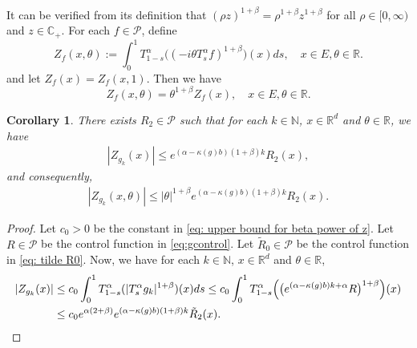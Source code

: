\documentclass[12pt, a4paper]{amsart}
\newtheorem{cor}[thm]{Corollary}
\theoremstyle{definition}
\numberwithin{equation}{section}
\begin{document}
    It can be verified from its definition that $(\rho z)^{1+\beta} = \rho^{1+\beta}z^{1+\beta}$ for all $\rho \in [0,\infty)$ and $z\in \mathbb C_+$.
For each $f\in \mathcal{P}$, define
\[
    Z_f(x,\theta)
    :=\int_0^1 T^{\alpha}_{1-s}\big((-i\theta T_s^{\alpha}f)^{1+\beta}\big)(x)ds ,
    \quad x\in E, \theta \in \mathbb R.
\]
and let $Z_f(x)=Z_f(x,1)$. 
Then we have
\begin{equation}\label{zfunction}
    Z_f(x,\theta)=\theta^{1+\beta}Z_f(x),
    \quad x\in E, \theta \in \mathbb R.
\end{equation}

\begin{cor}
\label{cor: corollary2}
    There exists $R_2\in \mathcal P$ such that for each $k\in\mathbb N$, $x\in \mathbb{R}^d$ and $\theta\in \mathbb{R}$, we have
\begin{align}
\label{zineq2}
    |Z_{g_k}(x)|\leq e^{(\alpha-\kappa(g)b)(1+\beta)k}R_2(x),
\end{align}
    and consequently,
\begin{align}
    |Z_{g_k}(x,\theta)|\leq |\theta|^{1+\beta}e^{(\alpha-\kappa(g)b)(1+\beta)k}R_2(x). \label{zineq1}
\end{align}
\end{cor}

\begin{proof}
    Let $c_0 > 0$ be the constant in \eqref{eq: upper bound for beta power of z}.
    Let $R\in \mathcal P$ be the control function in \eqref{eq:gcontrol}.
    Let $\tilde R_0 \in \mathcal P$ be the control function in \eqref{eq: tilde R0}.
    Now, we have for each $k\in\mathbb N$, $x\in \mathbb{R}^d$ and $\theta\in \mathbb{R}$,
\begin{align}
    |Z_{g_k}(x)|
    &\leq c_0\int_0^1 T_{1-s}^{\alpha}(|T_s^{\alpha}g_k|^{1+\beta})(x)ds 
    \leq c_0 \int_0^1 T_{1-s}^{\alpha}\Big(\big(e^{(\alpha-\kappa(g)b)k+\alpha}R\big)^{1+\beta}\Big)(x)
    \\&\leq c_0e^{\alpha(2+\beta)} e^{(\alpha-\kappa(g)b)(1+\beta)k}\tilde R_2(x). 
\qedhere
\end{align}
\end{proof}
\end{document}
